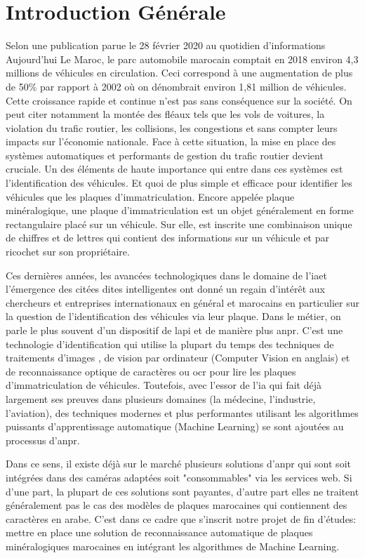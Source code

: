 \chapter*{Introduction Générale}
Selon une publication parue le 28 février 2020 au quotidien d'informations Aujourd'hui Le Maroc, le parc automobile marocain comptait en 2018 environ 4,3 millions de véhicules en circulation. Ceci correspond à une augmentation de plus de 50\% par rapport à 2002 où on dénombrait environ 1,81 million de véhicules. Cette croissance rapide et continue n’est pas sans conséquence sur la société. On peut citer notamment la montée des fléaux tels que les vols de voitures, la violation du trafic routier, les collisions, les congestions et sans compter leurs impacts sur l’économie nationale. Face à cette situation, la mise en place des systèmes automatiques et performants de gestion du trafic routier devient cruciale. Un des éléments de haute importance qui entre dans ces systèmes est l’identification des véhicules. Et quoi de plus simple et efficace pour identifier les véhicules que les plaques d’immatriculation. Encore appelée plaque minéralogique, une plaque d’immatriculation est un objet généralement en forme rectangulaire placé sur un véhicule. Sur elle, est inscrite une combinaison unique de chiffres et de lettres qui contient des informations sur un véhicule et par ricochet sur son propriétaire. 

Ces dernières années, les avancées technologiques dans le domaine de l’\acrfull{ia}et l'émergence des citées dites intelligentes ont donné un regain d'intérêt aux chercheurs et entreprises internationaux en général et marocains en particulier sur la question de l’identification des véhicules via leur plaque. Dans le métier, on  parle le plus souvent d’un dispositif de \acrfull{lapi} et de manière plus \acrfull{anpr}. C’est une technologie d’identification qui utilise la plupart du temps des techniques de traitements d’images , de vision par ordinateur (Computer Vision en anglais) et de reconnaissance optique de caractères ou \acrfull{ocr} pour lire les plaques d’immatriculation de véhicules. Toutefois, avec l’essor de l’\acrshort{ia} qui fait déjà largement ses preuves dans plusieurs domaines (la médecine, l’industrie, l’aviation), des techniques modernes et plus performantes utilisant les algorithmes puissants d’apprentissage automatique (Machine Learning) se sont ajoutées au processus d’\acrshort{anpr}. 

Dans ce sens, il existe déjà sur le marché plusieurs solutions d’\acrshort{anpr} qui sont soit intégrées dans des caméras adaptées soit "consommables" via les services web. Si d’une part, la plupart de ces solutions sont payantes, d'autre part elles ne traitent généralement pas le cas des modèles de plaques marocaines qui contiennent des caractères en arabe. C’est dans ce cadre que s’inscrit notre projet de fin d’études: mettre en place une solution de reconnaissance automatique de plaques minéralogiques marocaines en intégrant les algorithmes de Machine Learning.

